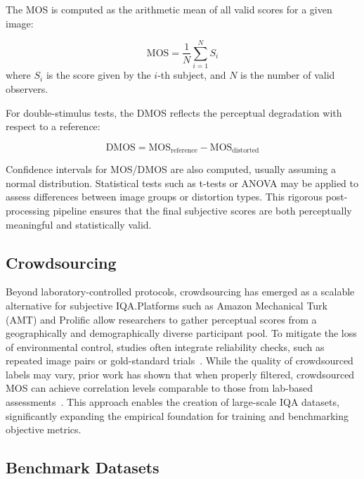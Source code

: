 The MOS is computed as the arithmetic mean of all valid scores for a given image:

\begin{equation}
\text{MOS} = \frac{1}{N} \sum_{i=1}^{N} S_i
\end{equation}
where $S_i$ is the score given by the $i$-th subject, and $N$ is the number of valid observers.

For double-stimulus tests, the DMOS reflects the perceptual degradation with respect to a reference:

\begin{equation}
\text{DMOS} = \text{MOS}_{\text{reference}} - \text{MOS}_{\text{distorted}}
\end{equation}

Confidence intervals for MOS/DMOS are also computed, usually assuming a normal distribution. Statistical tests such as t-tests or ANOVA may be applied to assess differences between image groups or distortion types. This rigorous post-processing pipeline ensures that the final subjective scores are both perceptually meaningful and statistically valid.


\subsection{Crowdsourcing}\label{sec:crowdsourcing}

Beyond laboratory-controlled protocols, crowdsourcing has emerged as a scalable alternative for subjective IQA.\@ Platforms such as Amazon Mechanical Turk (AMT) and Prolific allow researchers to gather perceptual scores from a geographically and demographically diverse participant pool. To mitigate the loss of environmental control, studies often integrate reliability checks, such as repeated image pairs or gold-standard trials~\cite{mos2016}. While the quality of crowdsourced labels may vary, prior work has shown that when properly filtered, crowdsourced MOS can achieve correlation levels comparable to those from lab-based assessments~\cite{jin2020pipal}. This approach enables the creation of large-scale IQA datasets, significantly expanding the empirical foundation for training and benchmarking objective metrics.

\subsection{Benchmark Datasets}\label{sec:benchmark_datasets}


